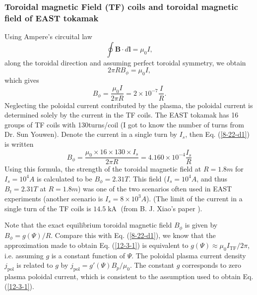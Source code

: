 \documentclass{article}
\newcommand{\tmop}[1]{\ensuremath{\operatorname{#1}}}
\begin{document}
\subsubsection{Toroidal magnetic Field (TF) coils and toroidal magnetic field
of EAST tokamak}

Using Ampere's circuital law
\begin{equation}
  \label{9-5-8} \oint \mathbf{B} \cdot d\mathbf{l}= \mu_0 I,
\end{equation}
along the toroidal direction and assuming perfect toroidal symmetry, we obtain
\begin{equation}
  2 \pi R B_{\phi} = \mu_0 I,
\end{equation}
which gives
\begin{equation}
  \label{8-22-d1} B_{\phi} = \frac{\mu_0 I}{2 \pi R} = 2 \times 10^{- 7}
  \frac{I}{R} .
\end{equation}
Neglecting the poloidal current contributed by the plasma, the poloidal
current is determined solely by the current in the TF coils. The EAST tokamak
has 16 groups of TF coils with 130turns/coil (I got to know the number of
turns from Dr. Sun Youwen). Denote the current in a single turn by $I_s$, then
Eq. (\ref{8-22-d1}) is written
\begin{equation}
  \label{12-3-1} B_{\phi} = \frac{\mu_0 \times 16 \times 130 \times I_s}{2 \pi
  R} = 4.160 \times 10^{- 4} \frac{I_s}{R}
\end{equation}
Using this formula, the strength of the toroidal magnetic field at $R = 1.8 m$
for $I_s = 10^4 A$ is calculated to be $B_{\phi} = 2.31 T$. This field ($I_s =
10^4 A$, and thus $B_t = 2.31 T$ at $R = 1.8 m$) was one of the two scenarios
often used in EAST experiments (another scenario is $I_s = 8 \times 10^3 A$).
(The limit of the current in a single turn of the TF coils is $14.5 \tmop{kA}$
(from B. J. Xiao's paper {\cite{xiao2008}}).

Note that the exact equilibrium toroidal magnetic field $B_{\phi}$ is given by
$B_{\phi} = g (\Psi) / R$. Compare this with Eq. (\ref{8-22-d1}), we know that
the approximation made to obtain Eq. (\ref{12-3-1}) is equivalent to $g (\Psi)
\approx \mu_0 I_{\tmop{TF}} / 2 \pi$, i.e. assuming $g$ is a constant function
of $\Psi$. The poloidal plasma current density $j_{\tmop{pol}}$ is related to
$g$ by $j_{\tmop{pol}} = g' (\Psi) B_p / \mu_0$. The constant $g$ corresponds
to zero plasma poloidal current, which is consistent to the assumption used to
obtain Eq. (\ref{12-3-1}).

\
\end{document}
